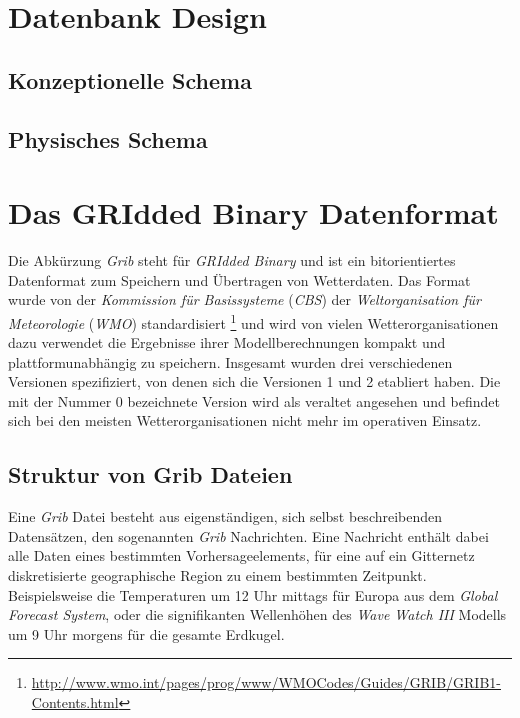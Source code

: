 \section{Datenbank Design}
\subsection{Konzeptionelle Schema}
\subsection{Physisches Schema}

\section{Das GRIdded Binary Datenformat}

Die Abkürzung \textit{Grib}  steht
für \textit{GRIdded Binary} und ist ein bitorientiertes Datenformat
zum Speichern und Übertragen von Wetterdaten. Das Format wurde von der
\textit{Kommission für Basissysteme} (\textit{CBS})
 der
\textit{Weltorganisation für Meteorologie} (\textit{WMO})
 standardisiert
\footnote{\url{http://www.wmo.int/pages/prog/www/WMOCodes/Guides/GRIB/GRIB1-Contents.html}}
und wird von vielen Wetterorganisationen dazu verwendet die Ergebnisse
ihrer Modellberechnungen kompakt und plattformunabhängig zu
speichern. Insgesamt wurden drei verschiedenen Versionen spezifiziert,
von denen sich die Versionen 1 und 2 etabliert haben. Die mit der
Nummer 0 bezeichnete Version wird als veraltet angesehen und befindet
sich bei den meisten Wetterorganisationen nicht mehr im operativen
Einsatz.

\subsection{Struktur von Grib Dateien}

Eine \textit{Grib} Datei besteht aus eigenständigen, sich selbst
beschreibenden Datensätzen, den sogenannten \textit{Grib}
Nachrichten. Eine Nachricht enthält dabei alle Daten eines bestimmten
Vorhersageelements, für eine auf ein Gitternetz diskretisierte
geographische Region zu einem bestimmten Zeitpunkt. Beispielsweise die
Temperaturen um 12 Uhr mittags für Europa aus dem \textit{Global
  Forecast System}, oder die signifikanten Wellenhöhen des
\textit{Wave Watch III} Modells um 9 Uhr morgens für die gesamte
Erdkugel.

